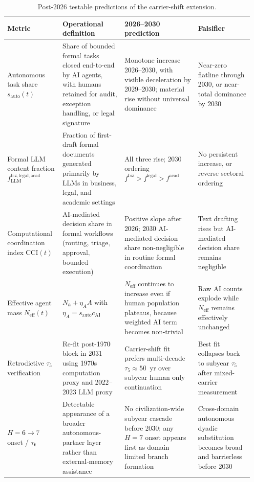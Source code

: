 \documentclass[11pt]{article}
\begin{document}
\begin{table}[H]
\centering
\caption{Post-2026 testable predictions of the carrier-shift extension.}
\label{tab:S10_9_4_carrier_predictions}
\small
\begin{tabular}{p{3.0cm}p{3.8cm}p{5.0cm}p{3.0cm}}
\toprule
Metric & Operational definition & 2026--2030 prediction & Falsifier \\
\midrule
Autonomous task share $s_{\mathrm{auto}}(t)$ & Share of bounded formal tasks closed end-to-end by AI agents, with humans retained for audit, exception handling, or legal signature & Monotone increase 2026--2030, with visible deceleration by 2029--2030; material rise without universal dominance & Near-zero flatline through 2030, or near-total dominance by 2030 \\
Formal LLM content fraction $f_{\mathrm{LLM}}^{\mathrm{biz,legal,acad}}$ & Fraction of first-draft formal documents generated primarily by LLMs in business, legal, and academic settings & All three rise; 2030 ordering $f^{\mathrm{biz}}>f^{\mathrm{legal}}>f^{\mathrm{acad}}$ & No persistent increase, or reverse sectoral ordering \\
Computational coordination index $\mathrm{CCI}(t)$ & AI-mediated decision share in formal workflows (routing, triage, approval, bounded execution) & Positive slope after 2026; 2030 AI-mediated decision share non-negligible in routine formal coordination & Text drafting rises but AI-mediated decision share remains negligible \\
Effective agent mass $N_{\mathrm{eff}}(t)$ & $N_h+\eta_A A$ with $\eta_A=s_{\mathrm{auto}}c_{\mathrm{AI}}$ & $N_{\mathrm{eff}}$ continues to increase even if human population plateaus, because weighted AI term becomes non-trivial & Raw AI counts explode while $N_{\mathrm{eff}}$ remains effectively unchanged \\
Retrodictive $\tau_5$ verification & Re-fit post-1970 block in 2031 using 1970s computation proxy and 2022--2023 LLM proxy & Carrier-shift fit prefers multi-decade $\tau_5\approx 50$~yr over subyear human-only continuation & Best fit collapses back to subyear $\tau_5$ after mixed-carrier measurement \\
$H{=}6\to 7$ onset / $\tau_6$ & Detectable appearance of a broader autonomous-partner layer rather than external-memory assistance & No civilization-wide subyear cascade before 2030; any $H{=}7$ onset appears first as domain-limited branch formation & Cross-domain autonomous dyadic substitution becomes broad and barrierless before 2030 \\
\bottomrule
\end{tabular}
\end{table}
\end{document}
